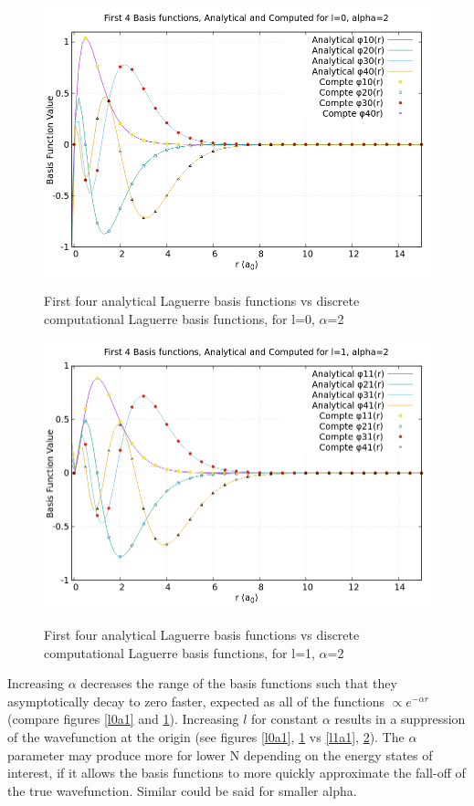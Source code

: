\documentclass{article}
\begin{document}
    \begin{figure}[H]
    	\centering
    	\includegraphics[scale=0.62]{Images/l0a2.png}\\
    	\caption{First four analytical Laguerre basis functions vs discrete computational Laguerre basis functions, for l=0, $\alpha$=2}
    	\label{l0a2}
    \end{figure}
    \begin{figure}[H]
    	\centering
    	\includegraphics[scale=0.62]{Images/l1a2.png}\\
    	\caption{First four analytical Laguerre basis functions vs discrete computational Laguerre basis functions, for l=1, $\alpha$=2}
    	\label{l1a2}
    \end{figure}
    
    Increasing $\alpha$ decreases the range of the basis functions such that they asymptotically decay to zero faster, expected as all of the functions $\propto e^{-\alpha r}$ (compare figures \ref{l0a1} and \ref{l0a2}). Increasing $l$ for constant $\alpha$ results in a suppression of the wavefunction at the origin (see figures \ref{l0a1}, \ref{l0a2} vs \ref{l1a1}, \ref{l1a2}). The $\alpha$ parameter may produce more for lower N depending on the energy states of interest, if it allows the basis functions to more quickly approximate the fall-off of the true wavefunction. Similar could be said for smaller alpha. 
    
\end{document}
